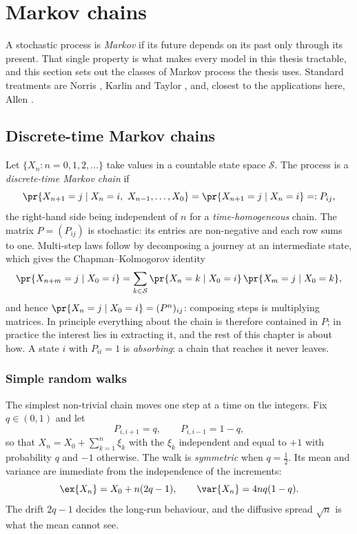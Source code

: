 \section{Markov chains}
\label{m:sec:chains}

A stochastic process is \emph{Markov} if its future depends on its past only
through its present. That single property is what makes every model in this thesis
tractable, and this section sets out the classes of Markov process the thesis uses.
Standard treatments are Norris \cite{Norris1997}, Karlin and Taylor
\cite{KarlinTaylor1975}, and, closest to the applications here, Allen
\cite{Allen2010}.

\subsection{Discrete-time Markov chains}
\label{m:sec:dtmc}

Let $\{X_n : n=0,1,2,\dots\}$ take values in a countable state space $\mathcal S$.
The process is a \emph{discrete-time Markov chain} if
\begin{equation}
\label{m:eq:dtmarkov}
\pr{X_{n+1}=j \mid X_n=i,\ X_{n-1},\dots,X_0} = \pr{X_{n+1}=j\mid X_n=i}
=: P_{ij},
\end{equation}
the right-hand side being independent of $n$ for a \emph{time-homogeneous} chain.
The matrix $P = (P_{ij})$ is stochastic: its entries are non-negative and each row
sums to one. Multi-step laws follow by decomposing a journey at an intermediate
state, which gives the Chapman--Kolmogorov identity
\begin{equation}
\label{m:eq:chapmankolmogorov}
\pr{X_{n+m}=j\mid X_0=i}
= \sum_{k\in\mathcal S}\pr{X_n=k\mid X_0=i}\,\pr{X_m=j\mid X_0=k},
\end{equation}
and hence $\pr{X_n=j\mid X_0=i}=(P^n)_{ij}$: composing steps is multiplying
matrices. In principle everything about the chain is therefore contained in $P$;
in practice the interest lies in extracting it, and the rest of this chapter is
about how. A state $i$ with $P_{ii}=1$ is \emph{absorbing}: a chain that reaches
it never leaves.

\subsubsection{Simple random walks}
\label{m:sec:randomwalk}

The simplest non-trivial chain moves one step at a time on the integers. Fix
$q\in(0,1)$ and let
\begin{equation}
\label{m:eq:rwrates}
P_{i,i+1} = q,
\qquad
P_{i,i-1} = 1-q,
\end{equation}
so that $X_n = X_0 + \sum_{k=1}^{n}\xi_k$ with the $\xi_k$ independent and equal to
$+1$ with probability $q$ and $-1$ otherwise. The walk is \emph{symmetric} when
$q=\tfrac12$. Its mean and variance are immediate from the independence of the
increments:
\begin{equation}
\label{m:eq:rwmoments}
\ex{X_n} = X_0 + n(2q-1),
\qquad
\var{X_n} = 4nq(1-q).
\end{equation}
The drift $2q-1$ decides the long-run behaviour, and the diffusive spread
$\sqrt{n}$ is what the mean cannot see.

